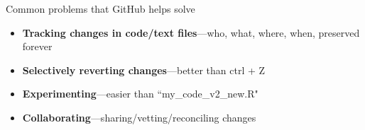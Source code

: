 \documentclass[12pt, compress]{beamer} %
\renewcommand{\texttt}[2][ceruleanblue]{\textcolor{#1}{\ttfamily #2}}%
\let\noteitem\item %
\renewcommand{\item}{ 
	\noteitem\vspace{\fill}
	}
\begin{document}
%	
%		
	
	\begin{frame}{Common problems that GitHub helps solve}
	
		\begin{itemize}
			\item \textbf{Tracking changes in code/text files}---who, what, where, when, preserved forever
			\item \textbf{Selectively reverting changes}---better than \texttt{ctrl + Z}
			\item \textbf{Experimenting}---easier than ``my\_code\_v2\_new.R"
			\item \textbf{Collaborating}---sharing/vetting/reconciling changes
		\end{itemize}
	\end{frame}
	
\end{document}
